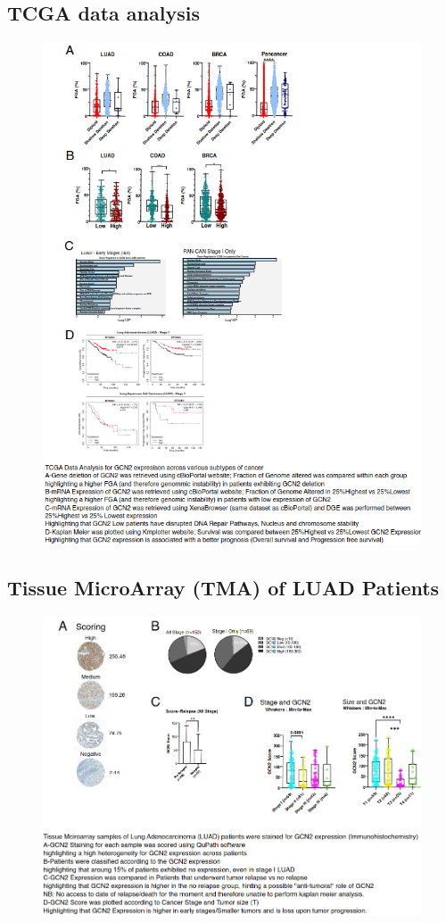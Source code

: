 \documentclass{style}
\begin{document}
\subsection{TCGA data analysis}\label{appendix:tgcaData}
\begin{figure}[H]
    \centering
    \includegraphics[width=16cm]{images/TGCAData.png}
\end{figure}
\newpage
\subsection{Tissue MicroArray (TMA) of LUAD Patients}\label{appendix:tissueMicroArray}
\begin{figure}[H]
    \centering
    \includegraphics[width=16cm]{images/TMA.png}
\end{figure}
\end{document}
